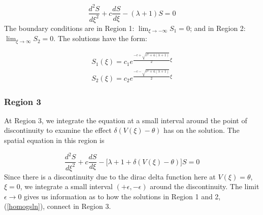\documentclass[12pt]{article}
\begin{document}
\begin{equation}
\frac{d^2S}{d\xi^2} + c\frac{dS}{d\xi} - (\lambda + 1)S = 0
\end{equation} 
The boundary conditions are in Region 1: $\lim_{\xi \to -\infty}S_1 = 0$; and in Region 2: $\lim_{\xi \to \infty}S_2 = 0$. The solutions have the form:

\begin{equation} \label{homogsln}
\begin{aligned}
S_1(\xi) = c_1e^{\frac{-c+\sqrt{c^2+4(\lambda+1)}}{2}\xi} \\
S_2(\xi) = c_2e^{\frac{-c-\sqrt{c^2+4(\lambda+1)}}{2}\xi} 
\end{aligned}
\end{equation}

\subsubsection{Region 3}
At Region 3, we integrate the equation at a small interval around the point of discontinuity to examine the effect $\delta(V(\xi)-\theta)$ has on the solution. The spatial equation in this region is 

\begin{equation}
\frac{d^2S}{d\xi^2} + c\frac{dS}{d\xi} - \big[\lambda + 1 + \delta(V(\xi)-\theta)\big]S = 0
\end{equation} 
Since there is a discontinuity due to the dirac delta function here at $V(\xi) = \theta$, $\xi = 0$, we integrate a small interval $(+\epsilon,-\epsilon)$ around the discontinuity. The limit $\epsilon \to 0$ gives us information as to how the solutions in Region 1 and 2, (\ref{homogsln}), connect in Region 3.
\end{document}
